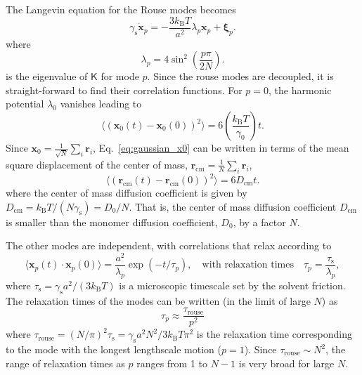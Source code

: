 \documentclass[../talant.diss.submit.tex]{subfiles}
\begin{document}
The Langevin equation for the Rouse modes becomes
\begin{equation}
  \label{eq:rouse_le}
  \gamma_\mathrm{s} \dot{\bm{x}}_p = -\frac{3 k_\mathrm{B}T}{a^2} \lambda_p\bm{x}_p + \bm{\xi}_p.
\end{equation}
where
\begin{equation}
  \label{eq:lambda_p}
    \lambda_p = 4 \sin^{2} \left( \frac{p\pi}{2N} \right). 
  \end{equation}
is the eigenvalue of $\bm{\mathsf{K}}$ for mode $p$.
Since the rouse modes are decoupled, it is straight-forward to find their correlation functions.
For $p=0$, 
the harmonic potential $\lambda_0$ vanishes leading to
\begin{equation}
  \label{eq:gaussian_x0}
  \langle \left(\bm{x}_0(t) - \bm{x}_0(0)\right)^2 \rangle =
  6 \left(\frac{k_\mathrm{B}T}{\gamma_0}\right) t.
\end{equation}
Since $\bm{x}_0 = \frac{1}{\sqrt{N}}\sum_i\bm{r}_i$, Eq.~\ref{eq:gaussian_x0}
can be written in terms of the mean square displacement of the center of mass, $\bm{r}_\mathrm{cm} = \frac{1}{N}\sum_i\bm{r}_i$,
\begin{equation}
  \label{eq:gaussian_cm}
  \langle \left(\bm{r}_\mathrm{cm}(t) - \bm{r}_\mathrm{cm}(0)\right)^2 \rangle =
  6 D_\mathrm{cm} t.
  \end{equation}
where the center of mass diffusion coefficient is given by
$D_\mathrm{cm} = k_\mathrm{B}T/(N\gamma_\mathrm{s}) = D_0/N$. That is,
the center of mass diffusion coefficient $D_\mathrm{cm}$ is smaller than the
monomer diffusion coefficient, $D_0$, by a factor $N$.

The other modes are independent, with correlations that relax according to
%
\begin{equation}
  \label{eq:modecorrelation}
  \langle \bm{x}_p(t)\cdot\bm{x}_p(0)\rangle = \frac{a^2}{\lambda_p}\exp(-t/\tau_p),
\quad \mbox{with relaxation times}  \quad \tau_p =  \frac{\tau_\mathrm{s}}{\lambda_p},
\end{equation}
where $\tau_\mathrm{s} = \gamma_\mathrm{s} a^2/(3k_\mathrm{B}T)$ is a microscopic timescale
set by the solvent friction.
The relaxation times of the modes can be written (in the limit of large $N$) as
%
\begin{equation}
  \label{eq:tau_rouse}
  \tau_p \approx \frac{\tau_\mathrm{rouse}}{p^2}
\end{equation}
where
$\tau_\mathrm{rouse} = (N/\pi)^2\tau_\mathrm{s} = \gamma_\mathrm{s} a^2
N^2/3k_\mathrm{B}T \pi^2$ is the relaxation time corresponding to the
mode with the longest lengthscale motion ($p=1$). Since
$\tau_\mathrm{rouse} \sim N^2$, the range of relaxation times as $p$ ranges from
1 to $N-1$ is very broad for large $N$.
\end{document}
